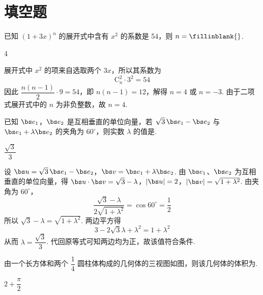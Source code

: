 \section{填空题}

\begin{problem}
已知 \((1+3x)^n\) 的展开式中含有 \(x^2\) 的系数是 54，则 \(n=\fillinblank{}\).
\end{problem}

\begin{answer}
4
\end{answer}

\begin{solution}
展开式中 \(x^2\) 的项来自选取两个 \(3x\)，所以其系数为
\[
\mathrm C_n^2\cdot3^2=54
\]
因此 \(\dfrac{n(n-1)}2\cdot9=54\)，即 \(n(n-1)=12\)，解得 \(n=4\) 或 \(n=-3\). 由于二项式展开式中的 \(n\) 为非负整数，故 \(n=4\).
\end{solution}

\begin{problem}
已知 \(\bs e_1\)，\(\bs e_2\) 是互相垂直的单位向量，若 \(\sqrt3\,\bs e_1-\bs e_2\) 与 \(\bs e_1+\lambda\bs e_2\) 的夹角为 \(60^\circ\)，则实数 \(\lambda\) 的值是\fillinblank{}.
\end{problem}

\begin{answer}
\(\dfrac{\sqrt3}{3}\)
\end{answer}

\begin{solution}
设 \(\bs u=\sqrt3\,\bs e_1-\bs e_2\)，\(\bs v=\bs e_1+\lambda\bs e_2\). 由 \(\bs e_1\)、\(\bs e_2\) 为互相垂直的单位向量，得
\(\bs u\cdot\bs v=\sqrt3-\lambda\)，\(|\bs u|=2\)，\(|\bs v|=\sqrt{1+\lambda^2}\).
由夹角为 \(60^\circ\)，
\[
\frac{\sqrt3-\lambda}{2\sqrt{1+\lambda^2}}=\cos60^\circ=\frac12
\]
所以 \(\sqrt3-\lambda=\sqrt{1+\lambda^2}\). 两边平方得
\[
3-2\sqrt3\lambda+\lambda^2=1+\lambda^2
\]
从而 \(\lambda=\dfrac{\sqrt3}{3}\). 代回原等式可知两边均为正，故该值符合条件.
\end{solution}

\begin{problem}
由一个长方体和两个 \(\dfrac14\) 圆柱体构成的几何体的三视图如图，则该几何体的体积为\fillinblank{}.

\end{problem}

\begin{answer}
\(2+\dfrac{\pi}{2}\)
\end{answer}

